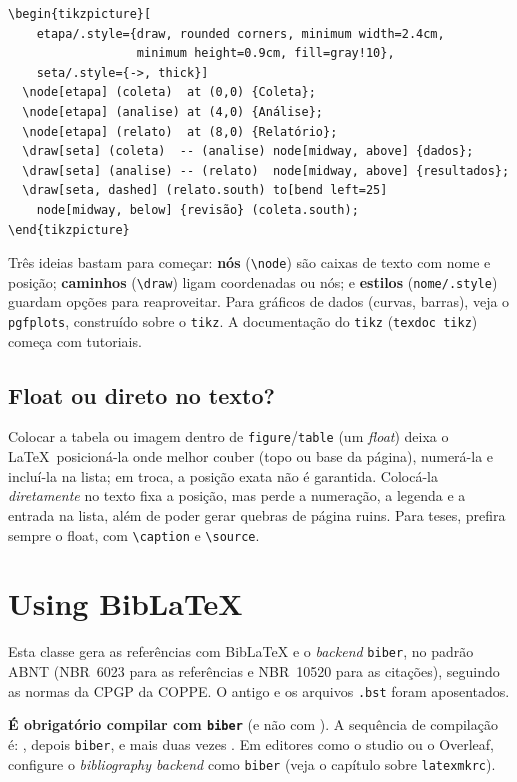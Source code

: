 \documentclass[dsc,pdfa]{coppe}
\begin{document}
\begin{verbatim}
\begin{tikzpicture}[
    etapa/.style={draw, rounded corners, minimum width=2.4cm,
                  minimum height=0.9cm, fill=gray!10},
    seta/.style={->, thick}]
  \node[etapa] (coleta)  at (0,0) {Coleta};
  \node[etapa] (analise) at (4,0) {Análise};
  \node[etapa] (relato)  at (8,0) {Relatório};
  \draw[seta] (coleta)  -- (analise) node[midway, above] {dados};
  \draw[seta] (analise) -- (relato)  node[midway, above] {resultados};
  \draw[seta, dashed] (relato.south) to[bend left=25]
    node[midway, below] {revisão} (coleta.south);
\end{tikzpicture}
\end{verbatim}

Três ideias bastam para começar: \textbf{nós} (\verb|\node|) são caixas de texto com nome e posição; \textbf{caminhos} (\verb|\draw|) ligam coordenadas ou nós; e \textbf{estilos} (\verb|nome/.style|) guardam opções para reaproveitar. Para gráficos de dados (curvas, barras), veja o \verb|pgfplots|, construído sobre o \verb|tikz|. A documentação do \verb|tikz| (\texttt{texdoc tikz}) começa com tutoriais.

\section{Float ou direto no texto?}

Colocar a tabela ou imagem dentro de \verb|figure|/\verb|table| (um \emph{float}) deixa o \LaTeX\ posicioná-la onde melhor couber (topo ou base da página), numerá-la e incluí-la na lista; em troca, a posição exata não é garantida. Colocá-la \emph{diretamente} no texto fixa a posição, mas perde a numeração, a legenda e a entrada na lista, além de poder gerar quebras de página ruins. Para teses, prefira sempre o float, com \verb|\caption| e \verb|\source|.

  \chapter{Using BibLaTeX}
  \label{cap:biblatex}

  Esta classe gera as referências com BibLaTeX e o \emph{backend} \texttt{biber}, no padrão ABNT (NBR~6023 para as referências e NBR~10520 para as citações), seguindo as normas da CPGP da COPPE. O antigo  e os arquivos \texttt{.bst} foram aposentados.

  \textbf{É obrigatório compilar com \texttt{biber}} (e não com ). A sequência de compilação é: , depois \texttt{biber}, e mais duas vezes . Em editores como o studio ou o Overleaf, configure o \emph{bibliography backend} como \texttt{biber} (veja o capítulo sobre \texttt{latexmkrc}).
\end{document}
